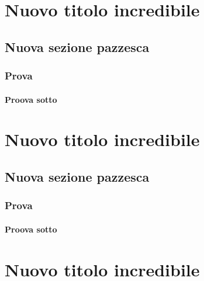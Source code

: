 \documentclass[a4paper, 11pt, openright, twoside]{report}
\begin{document}
\chapter[Nuovo titolo incredibile]{Nuovo titolo incredibile}
\label{chap:Nuovo titolo incredibile}

\lipsum[1]

\section[Nuova sezione pazzesca]{Nuova sezione pazzesca}
\label{chap:Nuova sezione pazzesca}

\subsection[Prova]{Prova}
\label{chap:Prova}

\subsubsection[Proova sotto]{Proova sotto}
\label{chap:Proova sotto}


\chapter[Nuovo titolo incredibile]{Nuovo titolo incredibile}
\label{chap:Nuovo titolo incredibile}

\lipsum[1]

\section[Nuova sezione pazzesca]{Nuova sezione pazzesca}
\label{chap:Nuova sezione pazzesca}

\subsection[Prova]{Prova}
\label{chap:Prova}

\subsubsection[Proova sotto]{Proova sotto}
\label{chap:Proova sotto}
\chapter[Nuovo titolo incredibile]{Nuovo titolo incredibile}
\label{chap:Nuovo titolo incredibile}
\end{document}
